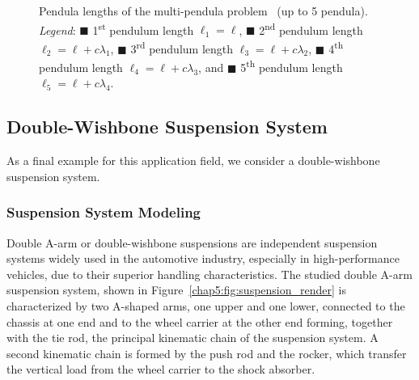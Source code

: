 \begin{figure}[htb]
  \centering
  \small{}
  \caption{Pendula lengths of the multi-pendula problem~\cite{nedialkov2008solvingIII} (up to 5 pendula). \emph{Legend}: \textcolor{mycolor1}{$\blacksquare$} 1\textsuperscript{st} pendulum length $\ell_1 = \ell$, \textcolor{mycolor2}{$\blacksquare$} 2\textsuperscript{nd} pendulum length $\ell_2 = \ell + c\lambda_1$, \textcolor{mycolor3}{$\blacksquare$} 3\textsuperscript{rd} pendulum length $\ell_3 = \ell + c\lambda_2$, \textcolor{mycolor4}{$\blacksquare$} 4\textsuperscript{th} pendulum length $\ell_4 = \ell + c\lambda_3$, and \textcolor{mycolor5}{$\blacksquare$} 5\textsuperscript{th} pendulum length $\ell_5 = \ell + c\lambda_4$.}
  \label{chap5:fig:npendula_length}
\end{figure}

\subsection{Double-Wishbone Suspension System}

As a final example for this application field, we consider a double-wishbone suspension system.

\subsubsection{Suspension System Modeling}

Double A-arm or double-wishbone suspensions are independent suspension systems widely used in the automotive industry, especially in high-performance vehicles, due to their superior handling characteristics. The studied double A-arm suspension system, shown in Figure~\ref{chap5:fig:suspension_render} is characterized by two A-shaped arms, one upper and one lower, connected to the chassis at one end and to the wheel carrier at the other end forming, together with the tie rod, the principal kinematic chain of the suspension system. A second kinematic chain is formed by the push rod and the rocker, which transfer the vertical load from the wheel carrier to the shock absorber.

